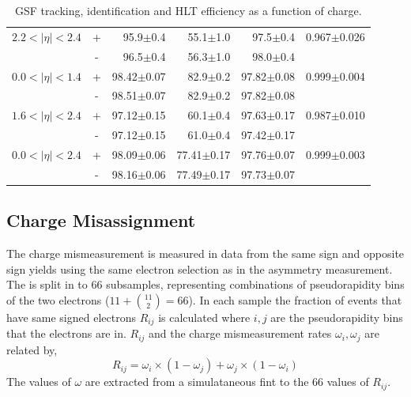 \begin{table}[htbp]
\begin{center}
\begin{tabular}{lcrrrr}
$2.2<| \eta |<2.4$ &+& 95.9$\pm$0.4 &55.1$\pm$1.0 &97.5$\pm$0.4 & 0.967$\pm$0.026\\
                   &-& 96.5$\pm$0.4 &56.3$\pm$1.0 &98.0$\pm$0.4 & \\
\midrule
$0.0<| \eta |<1.4$ &+& 98.42$\pm$0.07 &82.9$\pm$0.2 &97.82$\pm$0.08 & 0.999$\pm$0.004\\
                   &-& 98.51$\pm$0.07 &82.9$\pm$0.2 &97.82$\pm$0.08 & \\
$1.6<| \eta |<2.4$ &+& 97.12$\pm$0.15 &60.1$\pm$0.4 &97.63$\pm$0.17 & 0.987$\pm$0.010\\
                   &-& 97.12$\pm$0.15 &61.0$\pm$0.4 &97.42$\pm$0.17 & \\
\midrule
$0.0<| \eta |<2.4$ &+& 98.09$\pm$0.06 &77.41$\pm$0.17 &97.76$\pm$0.07 & 0.999$\pm$0.003\\
                   &-& 98.16$\pm$0.06 &77.49$\pm$0.17 &97.73$\pm$0.07 & \\
\bottomrule
\end{tabular}
\end{center}
\caption{\label{tab:updatedefficiency} GSF tracking, identification and HLT efficiency as a function of charge.}
\end{table}

\subsection{Charge Misassignment}
The charge mismeasurement is measured in data from the same sign and opposite
sign \PZ yields using the same electron selection as in the asymmetry
measurement.
The \HepProcess{\PZ\to\Pe\Pe} is split in to 66 subsamples, representing
combinations of pseudorapidity bins of the two electrons ($11+\binom{11}{2} =
66$).
In each sample the fraction of events that have same signed electrons $R_{ij}$
is calculated where $i,j$ are the pseudorapidity bins that the electrons are in.
$R_{ij}$ and the charge mismeasurement rates $\omega_{i},\omega_{j}$ are related
by,
\begin{equation}
R_{ij}=\omega_i \times(1-\omega_j) + \omega_j \times(1-\omega_i)
\end{equation}
The values of $\omega$ are extracted from a simulataneous fint to the 66 values
of $R_{ij}$.

